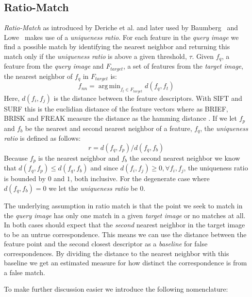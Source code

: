 \documentclass[journal]{IEEEtran}
\DeclareMathOperator*{\argmin}{arg\,min}
\begin{document}
\subsection{Ratio-Match}
%
\emph{Ratio-Match} as introduced by Deriche et al.
\cite{deriche1994robust} and later used by 
Baumberg~\cite{baumberg2000reliable} and Lowe~\cite{lowe2004sift} makes 
use of a \emph{uniqueness ratio}. For each feature in the \emph{query 
image} we find a possible match by identifying the nearest neighbor and 
returning this match only if the \emph{uniqueness ratio} is above a 
given threshold, $\tau$. Given $f_q$, a feature from the \emph{query 
image} and $F_{target}$, a set of features from the \emph{target image}, 
the nearest neighbor of $f_q$ in $F_{target}$ is:
\begin{equation*}
    f_{nn} = \argmin_{f_t \in F_{target}} d(f_q, f_t)
\end{equation*}
Here, $d(f_i, f_j)$ is the distance between the feature descriptors.  
With SIFT and SURF this is the euclidian distance of the feature vectors
\cite{lowe2004sift} \cite{bay2006surf} where as BRIEF, BRISK and FREAK 
measure the distance as the hamming distance \cite{leutenegger2011brisk} 
\cite{calonder2010brief} \cite{alahi2012freak}.  If we let $f_p$ and 
$f_b$ be the nearest and second nearest neighbor of a feature, $f_q$, 
the \emph{uniqueness ratio} is defined as follows:
\begin{equation*}
    r = d(f_q, f_p) / d(f_q, f_b)
\end{equation*}
Because $f_p$ is the nearest neighbor and $f_b$ the second nearest 
neighbor we know that $d(f_q, f_p) \leq d(f_q, f_b)$ and since $d(f_i, 
f_j) \geq 0, \forall f_i,f_j$, the uniqueness ratio is bounded by $0$ 
and $1$, both inclusive. For the degenerate case where $d(f_q, f_b) = 0$
we let the \emph{uniqueness ratio} be $0$.

The underlying assumption in ratio match is that the point we seek to 
match in the \emph{query image} has only one match in a given 
\emph{target image} or no matches at all. In both cases should expect 
that the \emph{second} nearest neighbor in the target image to be an 
untrue correspondence.  This means we can use the distance between the 
feature point and the second closest descriptor as a \emph{baseline} for 
false correspondences. By dividing the distance to the nearest neighbor 
with this baseline we get an estimated measure for how distinct the 
correspondence is from a false match.  

To make further discussion easier we introduce the following 
nomenclature:
\end{document}
